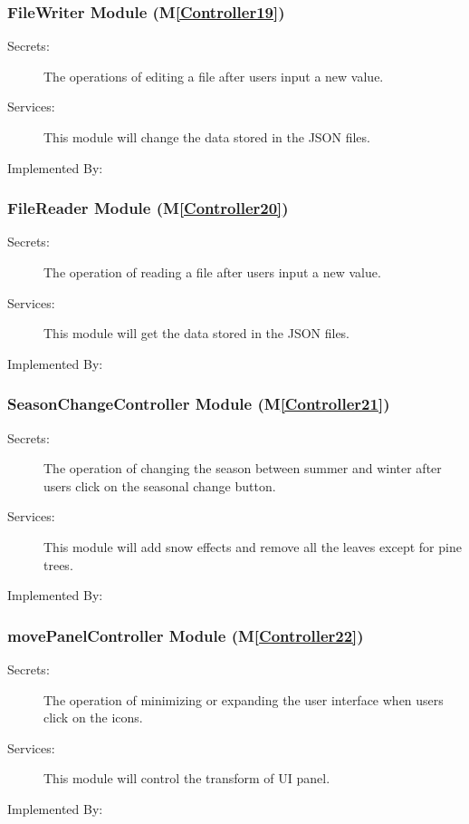 \documentclass[12pt, titlepage]{article}
\newcommand{\mref}[1]{M\ref{#1}}
\begin{document}
\renewcommand{\bt}{\textbf{Write into the file}}
\subsubsection{FileWriter Module (\mref{Controller19})}
\begin{description}
\item[Secrets:] The operations of editing a file after users input a new value.
\item[Services:] This module will change the data stored in the JSON files.
\item[Implemented By:] \progname{}
\end{description}

\renewcommand{\bt}{\textbf{Read from the file}}
\subsubsection{FileReader Module (\mref{Controller20})}
\begin{description}
\item[Secrets:] The operation of reading a file after users input a new value.
\item[Services:] This module will get the data stored in the JSON files.
\item[Implemented By:] \progname{}
\end{description}

\renewcommand{\bt}{\textbf{Switch the season}}
\subsubsection{SeasonChangeController Module (\mref{Controller21})}
\begin{description}
\item[Secrets:] The operation of changing the season between summer and winter after users click on the seasonal change button.
\item[Services:] This module will add snow effects and remove all the leaves except for pine trees.
\item[Implemented By:] \progname{}
\end{description}

\renewcommand{\bt}{\textbf{Move the panel}}
\subsubsection{movePanelController Module (\mref{Controller22})}
\begin{description}
\item[Secrets:] The operation of minimizing or expanding the user interface when users click on the icons.
\item[Services:] This module will control the transform of UI panel.
\item[Implemented By:] \progname{}
\end{description}
\end{document}
